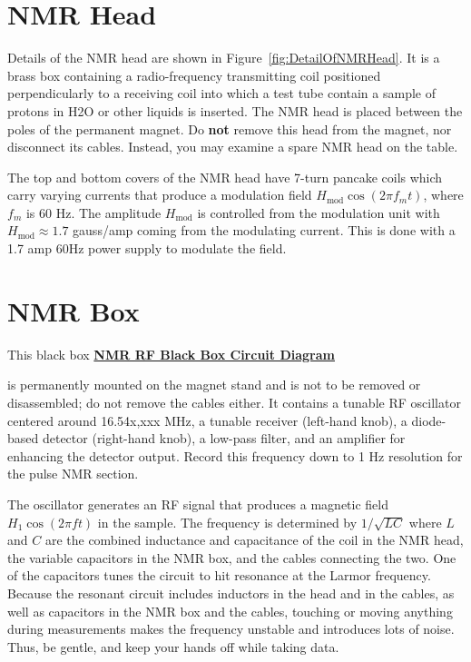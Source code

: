 \documentclass{../lab}
\begin{document}
\section{NMR Head}

Details of the NMR head are shown in Figure~\ref{fig:DetailOfNMRHead}. It is a brass box containing a radio-frequency transmitting coil positioned perpendicularly to a receiving coil into which a test tube contain a sample of protons in H2O or other liquids is inserted. The NMR head is placed between the poles of the permanent magnet. Do \textbf{not} remove this head from the magnet, nor disconnect its cables. Instead, you may examine a spare NMR head on the table.

The top and bottom covers of the NMR head have 7-turn pancake coils which carry varying currents that produce a modulation field $H_\text{mod} \cos(2 \pi f_m t)$, where $f_m$ is 60 Hz. The amplitude $H_\text{mod}$ is controlled from the modulation unit with $H_\text{mod} \approx 1.7$ gauss/amp coming from the modulating current. This is done with a 1.7 amp 60Hz power supply to modulate the field.

\newpage

\section{NMR Box}

This black box \href{http://experimentationlab.berkeley.edu/sites/default/files/images/NMR31.gif}{\textbf{NMR RF Black Box Circuit Diagram}}

is permanently mounted on the magnet stand and is not to be removed or disassembled; do not remove the cables either. It contains a tunable RF oscillator centered around 16.54x,xxx MHz, a tunable receiver (left-hand knob), a diode-based detector (right-hand knob), a low-pass filter, and an amplifier for enhancing the detector output. Record this frequency down to 1 Hz resolution for the pulse NMR section.

The oscillator generates an RF signal that produces a magnetic field $H_1\cos(2\pi f t)$ in the sample. The frequency is determined by $1/\sqrt{LC}$ where $L$ and $C$ are the combined inductance and capacitance of the coil in the NMR head, the variable capacitors in the NMR box, and the cables connecting the two. One of the capacitors tunes the circuit to hit resonance at the Larmor frequency. Because the resonant circuit includes inductors in the head and in the cables, as well as capacitors in the NMR box and the cables, touching or moving anything during measurements makes the frequency unstable and introduces lots of noise. Thus, be gentle, and keep your hands off while taking data.
\end{document}
